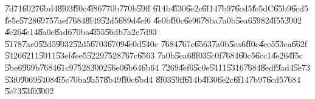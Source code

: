 \U{7d71}\U{6027}\U{6bd4}\U{8f03}\U{ff0c}\U{4f86}\U{770b}\U{770b}\U{59ff}%
\U{614b}\U{4f30}\U{6e2c}\U{6f14}\U{7b97}\U{6cd5}\U{fe5d}C\U{65b9}\U{6cd5}%
\U{fe5e}\U{5728}\U{6975}\U{7aef}\U{7684}\U{8f49}\U{52d5}\U{689d}\U{4ef6}%
\U{4e0b}\U{ff0c}\U{6e96}\U{78ba}\U{7a0b}\U{5ea6}\U{5982}\U{4f55}\U{3002}%
\U{4e26}\U{4e14}\U{8a0e}\U{8ad6}\U{70ba}\U{4f55}\U{56db}\U{7a2e}\U{7d93}%
\U{5178}\U{7ae0}\U{52d5}\U{9032}\U{52d5}\U{6703}\U{6709}\U{4e0d}\U{540c}%
\U{7684}\U{767c}\U{6563}\U{7a0b}\U{5ea6}\U{ff0c}\U{4ee5}\U{53ca}\U{662f}%
\U{5426}\U{6211}\U{5011}\U{53ef}\U{4ee5}\U{5229}\U{7528}\U{767c}\U{6563}%
\U{7a0b}\U{5ea6}\U{8f03}\U{5c0f}\U{7684}\U{60c5}\U{6cc1}\U{4e26}\U{4f5c}%
\U{5be6}\U{969b}\U{7684}\U{61c9}\U{7528}\U{3002}\U{56e0}\U{6b64}\U{6b64}%
\U{7269}\U{4ef6}\U{5c0e}\U{5411}\U{5316}\U{7684}\U{8edf}\U{9ad4}\U{5e73}%
\U{53f0}\U{9069}\U{5408}\U{4f5c}\U{70ba}\U{9a57}\U{8b49}\U{ff0c}\U{6bd4}%
\U{8f03}\U{59ff}\U{614b}\U{4f30}\U{6e2c}\U{6f14}\U{7b97}\U{6cd5}\U{7684}%
\U{5e73}\U{53f0}\U{3002}

\bigskip

